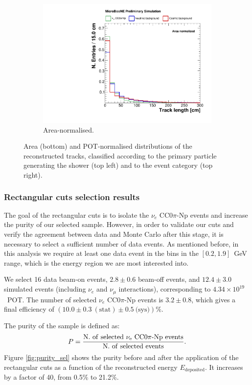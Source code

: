\begin{figure}[htbp]
\begin{subfigure}{0.49\textwidth}
    \includegraphics[width=\linewidth]{figures/h_track_length_norm.pdf}
    \caption{Area-normalised.} \label{fig:length_norm}
  \end{subfigure}
  \caption{Area (bottom) and POT-normalised distributions of the reconstructed tracks, classified according to the primary particle generating the shower (top left) and to the event category (top right).}
\end{figure}

\subsubsection{Rectangular cuts selection results}
The goal of the rectangular cuts is to isolate the $\nu_e$ CC0$\pi$-Np events and increase the purity of our selected sample. However, in order to validate our cuts and verify the agreement between data and Monte Carlo after this stage, it is necessary to select a sufficient number of data events. As mentioned before, in this analysis we require at least one data event in the bins in the $[0.2,1.9]$~GeV range, which is the energy region we are most interested into. 

We select 16 data beam-on events, $2.8\pm0.6$ beam-off events, and $12.4\pm3.0$ simulated events (including $\nu_e$ and $\nu_{\mu}$ interactions), corresponding to $4.34\times10^{19}$~POT. The number of selected $\nu_e$ CC0$\pi$-Np events is $3.2\pm0.8$, which gives a final efficiency of $(10.0\pm0.3~\mathrm{(stat)}\pm0.5~\text{(sys)})\%$. 

The purity of the sample is defined as:
\begin{equation}
P = \frac{\mathrm{N.~of~selected~\nu_e~CC0}\pi\mathrm{{\text -}Np~events}}{\mathrm{N.~of~selected~events}}.
\end{equation}
Figure \ref{fig:purity_sel} shows the purity before and after the application of the rectangular cuts as a function of the reconstructed energy $E_{\mathrm{deposited}}$. It increases by a factor of 40, from 0.5\% to 21.2\%.

